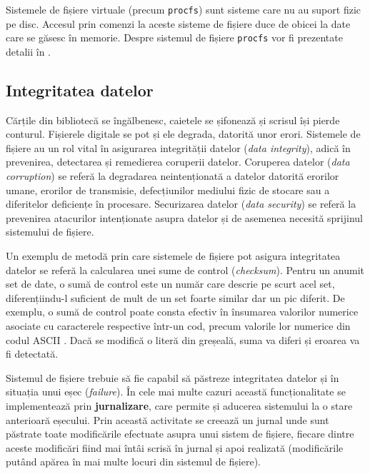 Sistemele de fișiere virtuale (precum \texttt{procfs}) sunt sisteme care nu au suport fizic pe disc.
Accesul prin comenzi la aceste sisteme de fișiere duce de obicei la date care se găsesc în memorie.
Despre sistemul de fișiere \texttt{procfs} vor fi prezentate detalii în .

\subsection{Integritatea datelor}
\label{sec:fs:integrity}

Cărțile din bibliotecă se îngălbenesc, caietele se șifonează și scrisul își pierde conturul.
Fișierele digitale se pot și ele degrada, datorită unor erori.
 Sistemele de fișiere au un rol vital în asigurarea integrității datelor (\textit{data integrity}), adică în prevenirea, detectarea și remedierea coruperii datelor.
Coruperea datelor (\textit{data corruption}) se referă la degradarea neintenționată a datelor datorită erorilor umane, erorilor de transmisie, defecțiunilor mediului fizic de stocare sau a diferitelor deficiențe în procesare.
Securizarea datelor (\textit{data security}) se referă la prevenirea atacurilor intenționate asupra datelor și de asemenea necesită sprijinul sistemului de fișiere.

Un exemplu de metodă prin care sistemele de fișiere pot asigura integritatea datelor se referă la calcularea unei sume de control (\textit{checksum}).
 Pentru un anumit set de date, o sumă de control este un număr care descrie pe scurt acel set, diferențiindu-l suficient de mult de un set foarte similar dar un pic diferit.
De exemplu, o sumă de control poate consta efectiv în însumarea valorilor numerice asociate cu caracterele respective într-un cod, precum valorile lor numerice din codul ASCII .
Dacă se modifică o literă din greșeală, suma va diferi și eroarea va fi detectată.

Sistemul de fișiere trebuie să fie capabil să păstreze integritatea datelor și în situația unui eșec (\textit{failure}).
În cele mai multe cazuri această funcționalitate se implementează prin \textbf{jurnalizare}, care permite și aducerea sistemului la o stare anterioară eșecului.
Prin această activitate se creează un jurnal unde sunt păstrate toate modificările efectuate asupra unui sistem de fișiere, fiecare dintre aceste modificări fiind mai întâi scrisă în jurnal și apoi realizată (modificările putând apărea în mai multe locuri din sistemul de fișiere).

